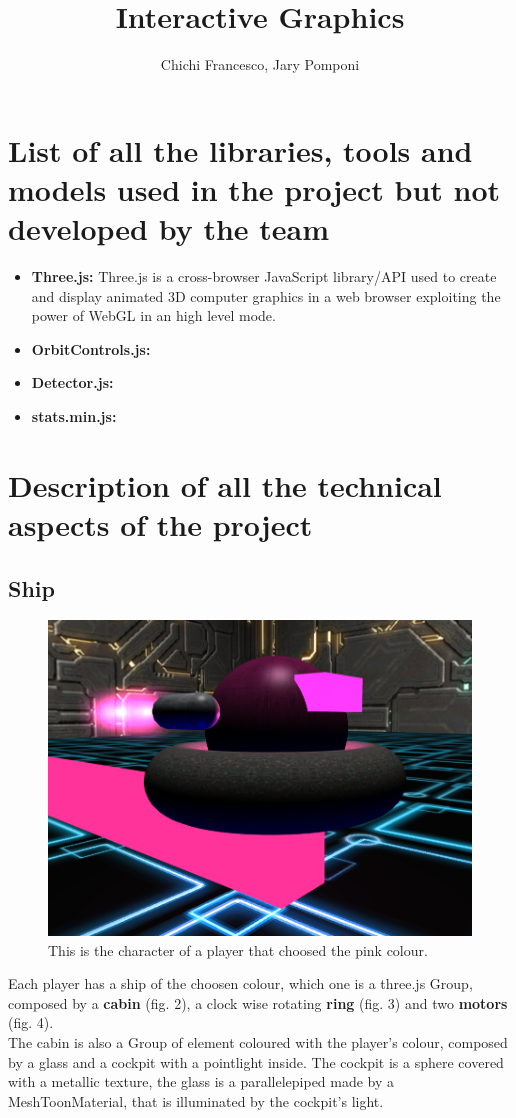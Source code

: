 \documentclass[11pt]{article}
\title{Interactive Graphics}
\author{Chichi Francesco, Jary Pomponi}
\begin{document}
\maketitle
\graphicspath{{img/}}

\section{List of all the libraries, tools and models used in the project but	not developed by the team}
\begin{itemize}
	\item \textbf{Three.js:}
		Three.js is a cross-browser JavaScript library/API used to create and display animated 3D computer graphics in a web browser exploiting the power of WebGL in an high level mode.
	\item \textbf{OrbitControls.js:}
	\item \textbf{Detector.js:}
	\item \textbf{stats.min.js:}
\end{itemize}
\section{Description of all the technical aspects of the project}
\subsection{Ship}
	
	
	\begin{figure}
		\centering
		\includegraphics[width=0.4\linewidth]{ship}
		\caption{This is the character of a player that choosed the pink colour.}
		\label{fig:ship}
	\end{figure}
	
	Each player has a ship of the choosen colour, which one is a three.js Group, composed by a \textbf{cabin} (fig. 2), a clock wise rotating \textbf{ring} (fig. 3) and two \textbf{motors} (fig. 4).\\
	
	The cabin is also a Group of element coloured with the player's colour, composed by a glass and a cockpit with a pointlight inside.
	The cockpit is a sphere covered with a metallic texture, the glass is a parallelepiped made by a MeshToonMaterial, that is illuminated by the cockpit's light.\\
	
\end{document}
